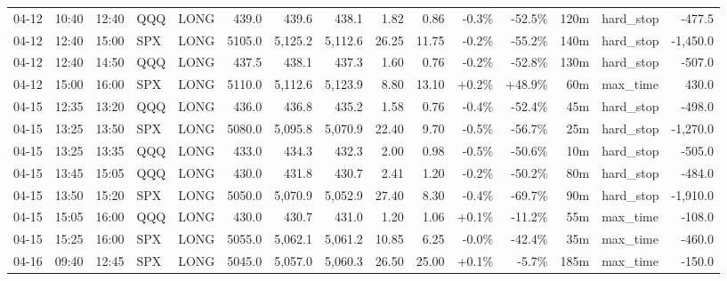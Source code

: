 \documentclass[11pt,a4paper,twoside]{article}
\begin{document}
\begin{landscape}
\begin{center}
\begin{longtable}{>{\color{txtmain}}l l l l l r r r r r r r r >{\color{txtmain}}l r}
04-12 & 10:40 & 12:40 & QQQ & LONG & 439.0 & 439.6 & 438.1 & 1.82 & 0.86 & \textcolor{lossred}{-0.3\%} & \textcolor{lossred}{-52.5\%} & 120m & hard\_stop & \textcolor{lossred}{-477.5} \\
04-12 & 12:40 & 15:00 & SPX & LONG & 5105.0 & 5,125.2 & 5,112.6 & 26.25 & 11.75 & \textcolor{lossred}{-0.2\%} & \textcolor{lossred}{-55.2\%} & 140m & hard\_stop & \textcolor{lossred}{-1,450.0} \\
04-12 & 12:40 & 14:50 & QQQ & LONG & 437.5 & 438.1 & 437.3 & 1.60 & 0.76 & \textcolor{lossred}{-0.2\%} & \textcolor{lossred}{-52.8\%} & 130m & hard\_stop & \textcolor{lossred}{-507.0} \\
04-12 & 15:00 & 16:00 & SPX & LONG & 5110.0 & 5,112.6 & 5,123.9 & 8.80 & 13.10 & \textcolor{wingreen}{+0.2\%} & \textcolor{wingreen}{+48.9\%} & 60m & max\_time & \textcolor{wingreen}{430.0} \\
04-15 & 12:35 & 13:20 & QQQ & LONG & 436.0 & 436.8 & 435.2 & 1.58 & 0.76 & \textcolor{lossred}{-0.4\%} & \textcolor{lossred}{-52.4\%} & 45m & hard\_stop & \textcolor{lossred}{-498.0} \\
04-15 & 13:25 & 13:50 & SPX & LONG & 5080.0 & 5,095.8 & 5,070.9 & 22.40 & 9.70 & \textcolor{lossred}{-0.5\%} & \textcolor{lossred}{-56.7\%} & 25m & hard\_stop & \textcolor{lossred}{-1,270.0} \\
04-15 & 13:25 & 13:35 & QQQ & LONG & 433.0 & 434.3 & 432.3 & 2.00 & 0.98 & \textcolor{lossred}{-0.5\%} & \textcolor{lossred}{-50.6\%} & 10m & hard\_stop & \textcolor{lossred}{-505.0} \\
04-15 & 13:45 & 15:05 & QQQ & LONG & 430.0 & 431.8 & 430.7 & 2.41 & 1.20 & \textcolor{lossred}{-0.2\%} & \textcolor{lossred}{-50.2\%} & 80m & hard\_stop & \textcolor{lossred}{-484.0} \\
04-15 & 13:50 & 15:20 & SPX & LONG & 5050.0 & 5,070.9 & 5,052.9 & 27.40 & 8.30 & \textcolor{lossred}{-0.4\%} & \textcolor{lossred}{-69.7\%} & 90m & hard\_stop & \textcolor{lossred}{-1,910.0} \\
04-15 & 15:05 & 16:00 & QQQ & LONG & 430.0 & 430.7 & 431.0 & 1.20 & 1.06 & \textcolor{wingreen}{+0.1\%} & \textcolor{lossred}{-11.2\%} & 55m & max\_time & \textcolor{lossred}{-108.0} \\
04-15 & 15:25 & 16:00 & SPX & LONG & 5055.0 & 5,062.1 & 5,061.2 & 10.85 & 6.25 & \textcolor{lossred}{-0.0\%} & \textcolor{lossred}{-42.4\%} & 35m & max\_time & \textcolor{lossred}{-460.0} \\
04-16 & 09:40 & 12:45 & SPX & LONG & 5045.0 & 5,057.0 & 5,060.3 & 26.50 & 25.00 & \textcolor{wingreen}{+0.1\%} & \textcolor{lossred}{-5.7\%} & 185m & max\_time & \textcolor{lossred}{-150.0} \\

\end{longtable}
\end{center}
\end{landscape}
\end{document}
